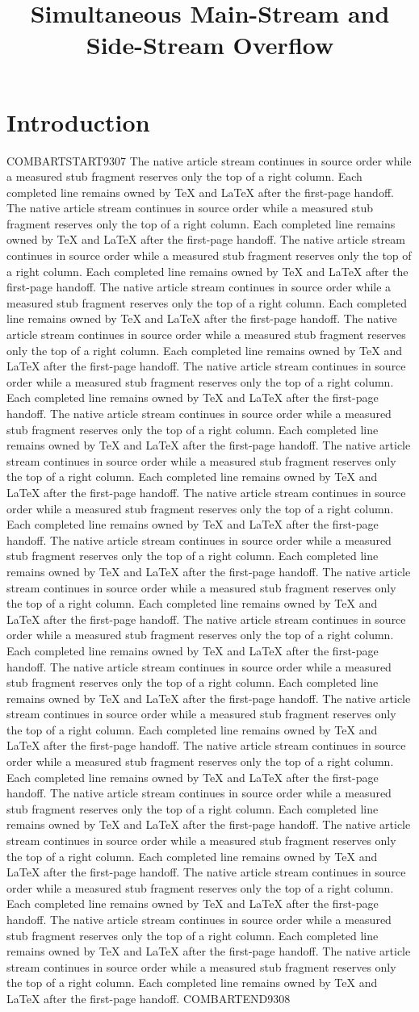 \documentclass{tnqjournal}
\title{Simultaneous Main-Stream and Side-Stream Overflow}
\newcommand\bodychunk{The native article stream continues in source order while a measured stub fragment reserves only the top of a right column. Each completed line remains owned by TeX and LaTeX after the first-page handoff. }
\begin{document}
\maketitle
\section{Introduction}
COMBARTSTART9307 \bodychunk\bodychunk\bodychunk\bodychunk\bodychunk
\bodychunk\bodychunk\bodychunk\bodychunk\bodychunk
\bodychunk\bodychunk\bodychunk\bodychunk\bodychunk
\bodychunk\bodychunk\bodychunk\bodychunk\bodychunk
COMBARTEND9308
\end{document}
